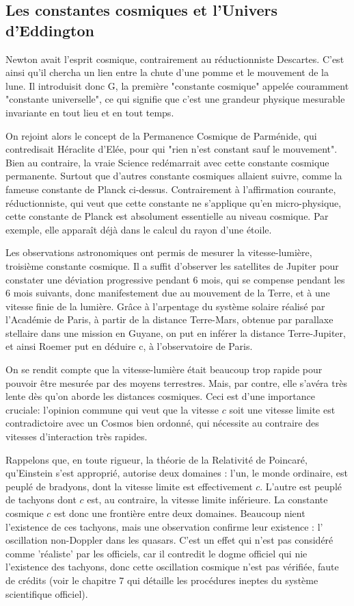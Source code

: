 \documentclass[a4paper,12pt]{article}
\begin{document}
\subsection{Les constantes cosmiques et l'Univers d'Eddington}

Newton avait l'esprit cosmique, contrairement au réductionniste Descartes. C'est ainsi qu'il chercha un lien entre la chute d'une pomme et le mouvement de la lune. Il introduisit donc G, la première "constante cosmique" appelée couramment "constante universelle", ce qui signifie que c'est une grandeur physique mesurable invariante en tout lieu et en tout temps. 

On rejoint alors le concept de la Permanence Cosmique de Parménide, qui contredisait Héraclite d'Elée, pour qui "rien n'est constant sauf le mouvement". Bien au contraire, la vraie Science  redémarrait avec cette constante cosmique permanente. Surtout que d'autres constante cosmiques allaient suivre, comme la fameuse constante de Planck ci-dessus. Contrairement à l'affirmation courante, réductionniste, qui veut que cette constante ne s'applique qu'en micro-physique, cette constante de Planck est absolument essentielle au niveau cosmique. Par exemple, elle apparaît déjà dans le calcul du rayon d'une étoile.

Les observations astronomiques ont permis de mesurer la vitesse-lumière, troisième constante cosmique. Il a suffit d'observer les satellites de Jupiter pour constater une déviation progressive pendant 6 mois, qui se compense pendant les 6 mois suivants, donc manifestement due au mouvement de la Terre, et à une vitesse finie de la lumière. Grâce à l'arpentage du système solaire réalisé par l'Académie de Paris, à partir de la distance Terre-Mars, obtenue par parallaxe stellaire dans une mission en Guyane, on put en inférer la distance Terre-Jupiter, et ainsi Roemer put en déduire c, à l'observatoire de Paris.

On se rendit compte que la vitesse-lumière était beaucoup trop rapide pour pouvoir être mesurée par des moyens terrestres. Mais, par contre, elle s'avéra très lente dès qu'on aborde les distances cosmiques. Ceci est d'une importance cruciale: l'opinion commune qui veut que la vitesse $c$ soit une vitesse limite est contradictoire avec un Cosmos bien ordonné, qui nécessite au contraire des vitesses d'interaction très rapides.

Rappelons que, en toute rigueur, la théorie de la Relativité de Poincaré, qu'Einstein s'est approprié, autorise deux domaines : l'un, le monde ordinaire, est peuplé de bradyons, dont la vitesse limite est effectivement $c$. L'autre est peuplé de tachyons dont $c$ est, au contraire, la vitesse limite inférieure. La constante cosmique $c$ est donc une frontière entre deux domaines. Beaucoup nient l'existence de ces tachyons, mais une observation confirme leur existence : l' oscillation non-Doppler dans les quasars. C'est un effet qui n'est pas considéré comme 'réaliste' par les officiels, car il contredit le dogme officiel qui nie l'existence des tachyons, donc cette oscillation cosmique n'est pas vérifiée, faute de crédits (voir le chapitre 7 qui détaille les procédures ineptes du système scientifique officiel).
\end{document}
